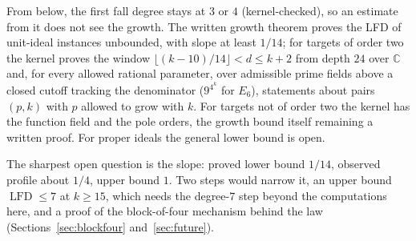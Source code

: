 \documentclass[11pt]{article}
\theoremstyle{definition}\newtheorem{definition}[theorem]{Definition}
\theoremstyle{remark}\newtheorem{remark}[theorem]{Remark}
\newcommand{\lfd}{\operatorname{LFD}}
\begin{document}
From below, the first fall degree stays at $3$ or $4$ (kernel-checked), so an
estimate from it does not see the growth. The written growth theorem proves
the LFD of unit-ideal instances unbounded, with slope at least $1/14$; for
targets of order two the kernel proves the window
$\lfloor(k-10)/14\rfloor<d\le k+2$ from depth $24$ over $\mathbb{C}$ and, for
every allowed rational parameter, over admissible prime fields above a closed
cutoff tracking the denominator ($9^{4^k}$ for $E_6$), statements about pairs
$(p,k)$ with $p$ allowed to grow with $k$. For targets not of order two the
kernel has the function field and the pole orders, the growth bound itself
remaining a written proof. For proper ideals the general lower bound is open.

The sharpest open question is the slope: proved lower bound $1/14$, observed
profile about $1/4$, upper bound $1$. Two steps would narrow it, an upper
bound $\lfd\le7$ at $k\ge15$, which needs the degree-$7$ step beyond the
computations here, and a proof of the block-of-four mechanism behind the law
(Sections~\ref{sec:blockfour} and~\ref{sec:future}).

\appendix
\small
\end{document}
